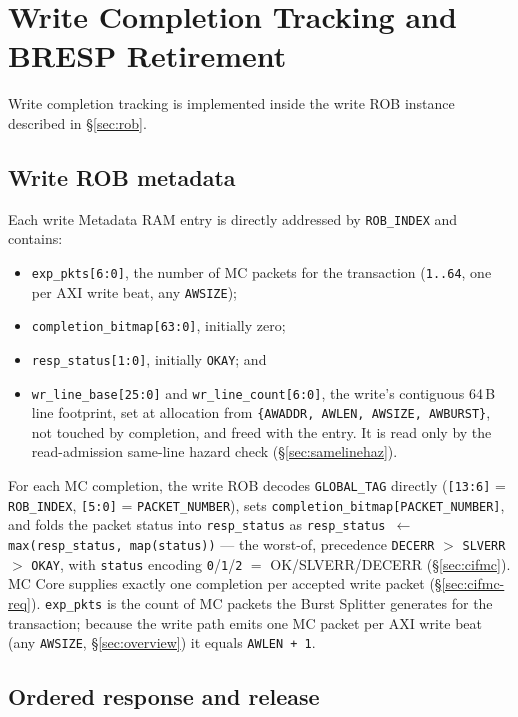 \section{Write Completion Tracking and BRESP Retirement}
\label{sec:write-completion}

Write completion tracking is implemented inside the write ROB instance
described in \S\ref{sec:rob}.

\subsection{Write ROB metadata}

Each write Metadata RAM entry is directly addressed by \texttt{ROB\_INDEX}
and contains:
\begin{itemize}[noitemsep]
  \item \texttt{exp\_pkts[6:0]}, the number of MC packets for the
        transaction (\texttt{1..64}, one per AXI write beat, any \texttt{AWSIZE});
  \item \texttt{completion\_bitmap[63:0]}, initially zero;
  \item \texttt{resp\_status[1:0]}, initially \texttt{OKAY}; and
  \item \texttt{wr\_line\_base[25:0]} and \texttt{wr\_line\_count[6:0]}, the
        write's contiguous 64\,B line footprint, set at allocation from
        \texttt{\{AWADDR, AWLEN, AWSIZE, AWBURST\}}, not touched by
        completion, and freed with the entry. It is read only by the
        read-admission same-line hazard check (\S\ref{sec:samelinehaz}).
\end{itemize}

For each MC completion, the write ROB decodes \texttt{GLOBAL\_TAG} directly
(\texttt{[13:6]} = \texttt{ROB\_INDEX}, \texttt{[5:0]} =
\texttt{PACKET\_NUMBER}), sets \texttt{completion\_bitmap[PACKET\_NUMBER]},
and folds the packet status into \texttt{resp\_status} as
\texttt{resp\_status $\leftarrow$ max(resp\_status, map(status))} --- the
worst-of, precedence \texttt{DECERR} $>$ \texttt{SLVERR} $>$ \texttt{OKAY},
with \texttt{status} encoding \texttt{0}/\texttt{1}/\texttt{2} $=$
OK/SLVERR/DECERR (\S\ref{sec:cifmc}).  MC Core supplies exactly one
completion per accepted write packet (\S\ref{sec:cifmc-req}).
\texttt{exp\_pkts} is the count of MC packets the Burst Splitter generates for
the transaction; because the write path emits one MC packet per AXI write
beat (any \texttt{AWSIZE}, \S\ref{sec:overview}) it equals \texttt{AWLEN + 1}.

\subsection{Ordered response and release}

